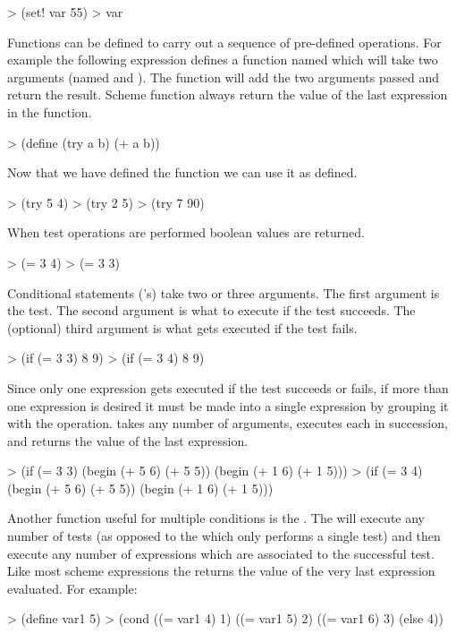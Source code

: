 \begcode
> (set! var 55)
> var
\endcode

Functions can be defined to carry out a sequence of pre-defined
operations.  For example the following expression defines a function
named  which will take two arguments (named  and
).  The function will add the two arguments passed and return
the result.  Scheme function always return the value of the last
expression in the function.


\begcode
> (define (try a b)
          (+ a b))
\endcode

Now that we have defined the function we can use it as defined.

\begcode
> (try 5 4)
> (try 2 5)
> (try 7 90)
\endcode


When test operations are performed boolean values are returned.


\begcode
> (= 3 4)
> (= 3 3)
\endcode


Conditional statements ('s) take two or three arguments.  The first
argument is the test.  The second argument is what to execute if the
test succeeds.  The (optional) third argument is what gets executed if
the test fails.


\begcode
> (if (= 3 3)
      8
      9)
> (if (= 3 4)
      8
      9)
\endcode

Since only one expression gets executed if the test succeeds or fails,
if more than one expression is desired it must be made into a single
expression by grouping it with the  operation.  
takes any number of arguments, executes each in succession, and
returns the value of the last expression.


\begcode
> (if (= 3 3)
      (begin
          (+ 5 6)
          (+ 5 5))
      (begin
          (+ 1 6)
          (+ 1 5)))
> (if (= 3 4)
      (begin
          (+ 5 6)
          (+ 5 5))
      (begin
          (+ 1 6)
          (+ 1 5)))
\endcode

Another function useful for multiple conditions is the .
The  will execute any number of tests (as opposed to the 
which only performs a single test) and then execute any number of
expressions which are associated to the successful test.  Like most
scheme expressions the  returns the value of the very last
expression evaluated.  For example:

\begcode
> (define var1 5)
> (cond ((= var1 4)
         1)
        ((= var1 5)
         2)
        ((= var1 6)
         3)
        (else 4))
\endcode


